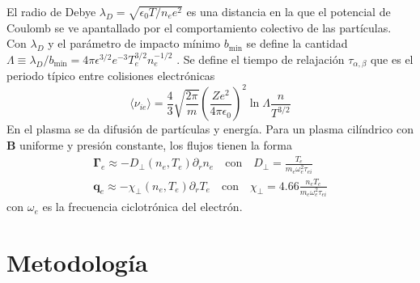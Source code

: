  El radio de Debye $\lambda_D = \sqrt{\epsilon_0 T / n_e e^2}$ es una distancia en la que el potencial de Coulomb se ve apantallado por el comportamiento colectivo de las partículas. Con $\lambda_D$ y el parámetro de impacto mínimo $b_\text{min}$ se define la cantidad $\Lambda \equiv \lambda_D/ b_\text{min} = 4\pi \epsilon^{3/2} e^{-3} T_e^{3/2} n_e^{-1/2}$ \cite{goldston1995, helander2005}. Se define el tiempo de relajación $\tau_{\alpha, \beta}$ que es el periodo típico entre colisiones electrónicas
\begin{equation}\label{eq:nuei}
	\langle \nu_{ie} \rangle = \frac{4}{3}\sqrt{\frac{2\pi}{m}}\left(\frac{Ze^2}{4\pi \epsilon_0}\right)^2\ln{\Lambda} \frac{n}{T^{3/2}}
\end{equation}
En el plasma se da difusión de partículas y energía. Para un plasma cilíndrico con $\bm{B}$ uniforme y presión constante, los flujos tienen la forma \cite{helander2005}
\begin{eqnarray}
	\bm{\Gamma}_e \approx -D_\perp(n_e, T_e) \partial_r n_e \quad \text{con} \quad D_\perp = \frac{T_e}{m_e \omega_e^2 \tau_{ei} } \label{eq:diffusionP} \\
	\bm{q}_e \approx -\chi_\perp(n_e,T_e) \partial_r T_e \quad \text{con} \quad \chi_\perp = 4.66\frac{n_eT_e}{m_e \omega_e^2 \tau_{ei} } \label{eq:diffusionE}
\end{eqnarray}
con $\omega_e$ es la frecuencia ciclotrónica del electrón. 
\section{Metodología}

